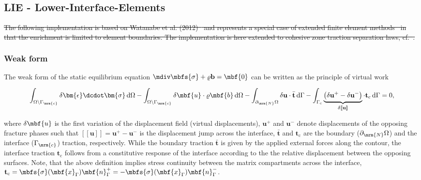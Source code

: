 \subsection{LIE - Lower-Interface-Elements}
\sout{The following implementation is based on Watanabe et al. (2012)~\cite{Watanabe2012} and represents a special case of extended finite element methods~\cite{Moees1999,Belytschko2009,belytschko2001arbitrary} in that the enrichment is limited to element boundaries. 
The implementation is here extended to cohesive zone traction separation laws, cf.~\cite{needleman1990analysisa,needleman1990analysisb,nguyen2001cohesive,Elices2002,Gasser2005,Meschke2007}.}

\subsubsection*{Weak form}
The weak form of the static equilibrium equation $\mdiv \mbfs{\sigma} + \varrho \mathbf{b} = \mbf{0}$ can be written as the principle of virtual work

\begin{equation}
\int_{\Omega \setminus \Gamma_\mrm{c}} \delta \bm{\epsilon} \dcdot \bm{\sigma} \, \mathrm{d} \Omega - \int_{\Omega \setminus \Gamma_\mrm{c}} \delta \mbf{u} \cdot \varrho \mbf{b} \, \mathrm{d} \Omega - \int_{\partial_\mrm{N}\Omega} \delta \mathbf{u} \cdot \bar{\mathbf{t}}\, \mathrm{d} \Gamma - \int_{\Gamma_{\mathrm{c}}} \underbrace{\left(\delta \mathbf{u^{+}} - \delta \mathbf{u^{-}}\right)}_{\delta [\![\mathbf{u}]\!]} \cdot \mathbf{t}_{\mathrm{c}} \, \mathrm{d} \Gamma = 0,
\label{eq:weak_form_equil_eq}
\end{equation}

where $\delta \mbf{u}$ is the first variation of the displacement field (virtual displacements), $\mathbf{u^{+}}$ and $\mathbf{u^{-}}$ denote displacements of the opposing fracture phases such that $[\![\mathbf{u}]\!] = \mathbf{u^{+}} - \mathbf{u^{-}}$ is the displacement jump across the interface, $\bar{\mathbf{t}}$ and $\mathbf{t}_{\mathrm{c}}$ are the boundary ($\partial_{\mrm{N}}\Omega$) and the interface ($\Gamma_\mrm{c}$) traction, respectively. While the boundary traction $\bar{\mathbf{t}}$ is given by the applied external forces along the contour, the interface traction $\mathbf{t}_{\mathrm{c}}$ follows from a constitutive response of the interface according to the the relative displacement between the opposing surfaces. Note, that the above definition implies stress continuity between the matrix compartments across the interface, $\mathbf{t}_{\mathrm{c}} = \mbfs{\sigma}(\mbf{x}_\Gamma) \mbf{n}^+_\Gamma = - \mbfs{\sigma}(\mbf{x}_\Gamma) \mbf{n}^-_\Gamma$.

